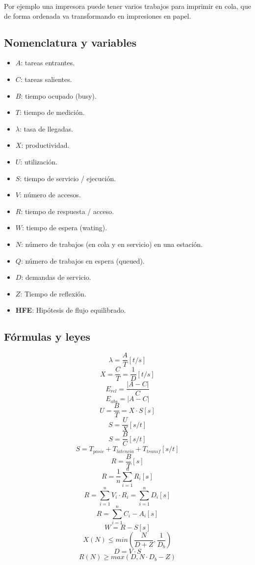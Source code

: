 Por ejemplo una impresora puede tener varios trabajos para imprimir en cola, que de forma ordenada va transformando en impresiones en papel.
\newpage
\subsection{Nomenclatura y variables}
\begin{itemize}
    \item $A$: tareas entrantes.
    \item $C$: tareas salientes.
    \item $B$: tiempo ocupado (busy).
    \item $T$: tiempo de medición.
    \item $\lambda$: tasa de llegadas.
    \item $X$: productividad.
    \item $U$: utilización.
    \item $S$: tiempo de servicio / ejecución.
    \item $V$: número de accesos.
    \item $R$: tiempo de respuesta / acceso.
    \item $W$: tiempo de espera (wating).
    \item $N$: número de trabajos (en cola y en servicio) en una estación.
    \item $Q$: número de trabajos en espera (queued).
    \item $D$: demandas de servicio.
    \item $Z$: Tiempo de reflexión.
    \item \textbf{HFE}: Hipótesis de flujo equilibrado.
\end{itemize}
\subsection{Fórmulas y leyes}
\begin{multicols}{2}
\[\lambda = \dfrac{A}{T}[t/s]\]
\[X = \dfrac{C}{T} = \dfrac{1}{D}[t/s]\]
\[E_{rel}= \dfrac{|A-C|}{C}\]
\[E_{abs}=|A-C|\]
\[U = \dfrac{B}{T}=X\cdot S[s]\]
\[S = \dfrac{U}{X}[s/t]\]
\[S = \dfrac{B}{C}[s/t]\]
\[S=T_{posic}+T_{latencia}+T_{transf}[s/t]\]
\[R = \dfrac{B}{T}[s]\]
\[R= \dfrac{1}{n}\sum_{i=1}^{n}R_i[s]\]
\[R = \sum_{i=1}^{n}V_i\cdot R_i = \sum_{i=1}^{n}D_i[s]\]
\[R = \sum_{i=1}^{n}C_i-A_i[s]\]
\[W = R-S[s]\]
\[X(N)\leq min(\dfrac{N}{D+Z}, \dfrac{1}{D_b})\]
\[D=V\cdot S\]
\[R(N)\geq max(D, N\cdot D_b-Z)\]
\end{multicols}

